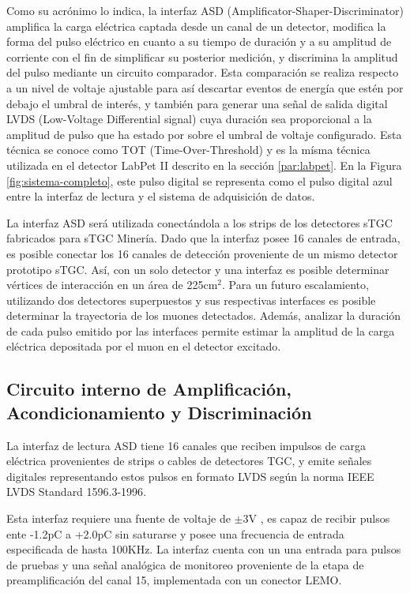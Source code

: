Como su acrónimo lo indica, la interfaz ASD (Amplificator-Shaper-Discriminator)  amplifica la carga eléctrica captada desde un canal de un detector,  modifica la forma del pulso eléctrico en cuanto a su tiempo de duración y a su amplitud de corriente con el fin de simplificar su posterior medición, y discrimina la amplitud del pulso mediante un circuito comparador. Esta comparación se realiza respecto a un nivel de voltaje ajustable para así descartar eventos de energía que estén por debajo el umbral de interés, y también para generar una señal de salida digital LVDS (Low-Voltage Differential signal) cuya duración sea proporcional a la amplitud de pulso que ha estado por sobre el umbral de voltaje configurado. Esta técnica se conoce como TOT (Time-Over-Threshold)  y es la mísma técnica utilizada en el detector LabPet II descrito en la sección \ref{par:labpet}.  En la Figura \ref{fig:sistema-completo}, este pulso digital se representa como el pulso digital azul entre la interfaz de lectura y el sistema de adquisición de datos.
        
La interfaz ASD será utilizada conectándola a los strips de los detectores sTGC fabricados para sTGC Minería. Dado que la interfaz posee 16 canales de entrada, es posible conectar los 16 canales de detección proveniente de un mismo detector prototipo sTGC. Así, con un solo detector y una interfaz es posible determinar vértices de interacción en un área de 225cm$^2$. Para un futuro escalamiento, utilizando dos detectores superpuestos y sus respectivas interfaces es posible determinar la trayectoria de los muones detectados. Además, analizar la duración de cada pulso emitido por las interfaces permite estimar la amplitud de la carga eléctrica depositada por el muon en el detector excitado.


\subsection{Circuito interno de Amplificación, Acondicionamiento y Discriminación}
La interfaz de lectura ASD tiene 16 canales que reciben impulsos de carga eléctrica provenientes de strips o cables de detectores TGC, y emite señales digitales representando estos pulsos en formato LVDS según la norma IEEE LVDS Standard 1596.3-1996\cite{1996IEEESociety}.

Esta interfaz requiere una fuente de voltaje de $\pm$3V\cite{1999ATLASICs} , es capaz de recibir pulsos ente -1.2pC a +2.0pC sin saturarse y posee una frecuencia de entrada especificada  de hasta 100KHz. La interfaz cuenta con un una entrada para pulsos de pruebas y una señal analógica de monitoreo proveniente de la etapa de preamplificación del canal 15, implementada con un conector LEMO.

